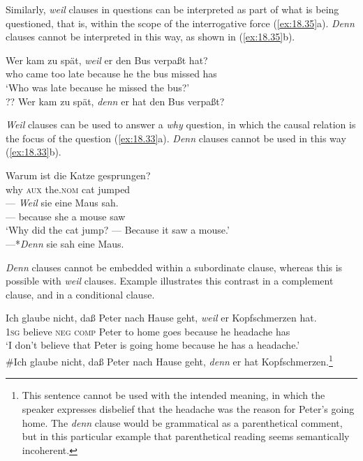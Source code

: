 Similarly, \textit{weil} clauses in questions can be interpreted as part of what is being questioned, that is, within the scope of the interrogative force (\ref{ex:18.35}a). \textit{Denn} clauses cannot be interpreted in this way, as shown in (\ref{ex:18.35}b).


\ea \label{ex:18.35}
\ea \gll  Wer kam zu spät, \textit{weil} er den Bus verpaßt hat?\\
who  came  too  late  because  he the bus missed has \\
\glt ‘Who was late because he missed the bus?’ \\
\ex ?? Wer kam zu spät, \textit{denn} er hat den Bus verpaßt?
                       \z
\z


\textit{Weil} clauses can be used to answer a \textit{why} question, in which the causal relation is the focus of the question (\ref{ex:18.33}a). \textit{Denn} clauses cannot be used in this way (\ref{ex:18.33}b).


\ea \label{ex:18.33}
\ea  \gll Warum  ist  die  Katze  gesprungen? \\
why  \textsc{aux}  the.\textsc{nom}  cat  jumped \\
\newline
\gll — \textit{Weil}  sie  eine  Maus  sah. \\
 —  because  she  a  mouse  saw\\
\glt ‘Why did the cat jump? — Because it saw a mouse.’ \\
\ex  —*\textit{Denn} sie sah eine Maus.
\z \z



\textit{Denn} clauses cannot be embedded within a subordinate clause, whereas this is possible with \textit{weil} clauses. Example  illustrates this contrast in a complement clause, and  in a conditional clause.


\ea \label{ex:18.36}
\ea   \gll Ich  glaube  nicht,  daß  Peter  nach  Hause  geht,  \textit{weil}  er  Kopfschmerzen  hat.\\
\textsc{1sg}  believe  \textsc{neg}  \textsc{comp}  Peter  to  home  goes  because  he  headache  has\\
\glt ‘I don’t believe that Peter is going home because he has a headache.’ \\
\ex  \#Ich glaube nicht, daß Peter nach Hause geht, \textit{denn} er hat Kopfschmerzen.\footnote{This sentence cannot be used with the intended meaning, in which the speaker expresses disbelief that the headache was the reason for Peter’s going home. The \textit{denn} clause would be grammatical as a parenthetical comment, but in this particular example that parenthetical reading seems semantically incoherent.}
\z \z

